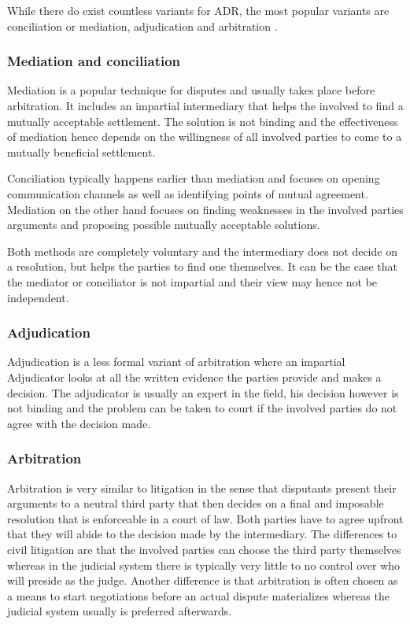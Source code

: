 \documentclass[12pt,msc,a4paper,oneside]{ucl_thesis}
\begin{document}
While there do exist countless variants for ADR, the most popular variants are conciliation or mediation, adjudication and arbitration \cite{using_adr:citizensadvice}.

\subsubsection{Mediation and conciliation}
Mediation is a popular technique for disputes and usually takes place before arbitration. It includes an impartial intermediary that helps the involved to find a mutually acceptable settlement. The solution is not binding and the effectiveness of mediation hence depends on the willingness of all involved parties to come to a mutually beneficial settlement.

Conciliation typically happens earlier than mediation and focuses on opening communication channels as well as identifying points of mutual agreement. Mediation on the other hand focuses on finding weaknesses in the involved parties arguments and proposing possible mutually acceptable solutions.

Both methods are completely voluntary and the intermediary does not decide on a resolution, but helps the parties to find one themselves. It can be the case that the mediator or conciliator is not impartial and their view may hence not be independent. \cite{using_adr:citizensadvice}

\subsubsection{Adjudication}
Adjudication is a less formal variant of arbitration where an impartial Adjudicator looks at all the written evidence the parties provide and makes a decision. The adjudicator is usually an expert in the field, his decision however is not binding and the problem can be taken to court if the involved parties do not agree with the decision made. \cite{using_adr:citizensadvice}

\subsubsection{Arbitration}
Arbitration is very similar to litigation in the sense that disputants present their arguments to a neutral third party that then decides on a final and imposable resolution that is enforceable in a court of law. Both parties have to agree upfront that they will abide to the decision made by the intermediary.
The differences to civil litigation are that the involved parties can choose the third party themselves whereas in the judicial system there is typically very little to no control over who will preside as the judge. Another difference is that arbitration is often chosen as a means to start negotiations before an actual dispute materializes whereas the judicial system usually is preferred afterwards. \cite{adr_overview:findlaw}
\end{document}
